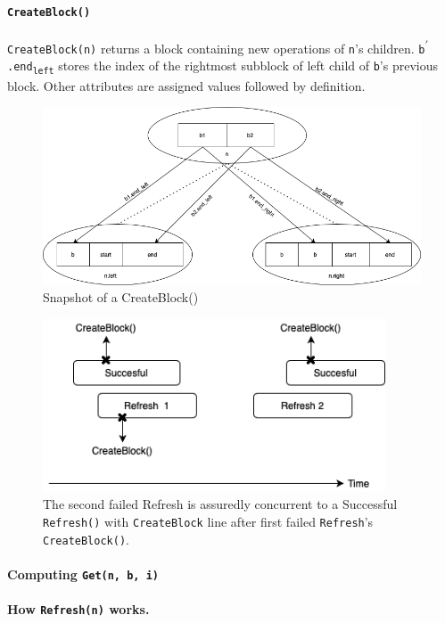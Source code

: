 \documentclass[10pt]{article}
\theoremstyle{definition}
\begin{document}
\paragraph{\texttt{CreateBlock()}} \texttt{CreateBlock(n)} returns a block containing new operations of \texttt{n}'s children. \texttt{b\textsuperscript{$\prime$}.end\textsubscript{left}} stores the index of the rightmost subblock of left child of \texttt{b}'s previous block. Other attributes are assigned values followed by definition.
\begin{figure}[hbt]
  \center\includegraphics[width=5.5in]{pics/createblock}
  \caption{\label{fig::createBlock}Snapshot of a CreateBlock()}
\end{figure}

\begin{figure}[hbt]
  \center\includegraphics[width=4in]{pics/doublerefresh.png}
  \caption{The second failed Refresh is assuredly concurrent to a Successful \texttt{Refresh()} with \texttt{CreateBlock} line after first failed \texttt{Refresh}'s \texttt{CreateBlock()}.}
\end{figure}

\paragraph{Computing \texttt{Get(n, b, i)}}

\paragraph{How \texttt{Refresh(n)} works.}
\end{document}
